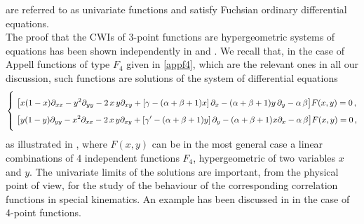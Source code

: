 \documentclass[a4paper,11pt,openright,twoside]{book}
\numberwithin{equation}{section}
\begin{document}
are referred to as univariate functions and satisfy Fuchsian ordinary
differential equations.\\
The proof that the CWIs of 3-point functions are hypergeometric systems of equations has been shown independently in \cite{Coriano:2013jba} and \cite{Bzowski:2013sza}. We recall that, in the case of Appell functions of type $F_4$ given in \eqref{appf4}, which are the relevant ones in all our discussion, such functions are solutions of the system of differential equations
\begin{equation}
	\label{F4diff.eq}
	\left\{\,\,
	\begin{aligned}
		&\\[-1.8ex]
		&\big[ x(1-x) \partial_{xx} - y^2 \partial_{yy}- 2 \, x \, y \partial_{xy}+  \left[ \gamma - (\alpha + \beta + 1) x \right] \partial_x- (\alpha + \beta + 1) y\,\partial_y  - \alpha \, \beta \big] F(x,y) = 0 \,, \notag \\[1ex]
		&\big[ y(1-y) \partial_{yy} - x^2 \partial_{xx} - 2 \, x \, y \partial_{xy} +  \left[ \gamma' - (\alpha + \beta + 1) y \right] \partial_y- (\alpha + \beta + 1) x \partial_x  - \alpha \, \beta \big] F(x,y) = 0 \,,\\[1.4ex] 
	\end{aligned}\right.
\end{equation}
as illustrated in \cite{Appell}, where $F(x,y)$ can be in the most general case a linear combinations of 4 independent functions $F_4$, hypergeometric of two variables $x$ and $y$. The univariate limits of the solutions are important, from the physical point of view, for the study of the behaviour of the corresponding correlation functions in special kinematics. An example has been discussed in \cite{Maglio:2019grh,Coriano:2020ccb,Coriano:2019nkw} in the case of 4-point functions. 

\end{document}
